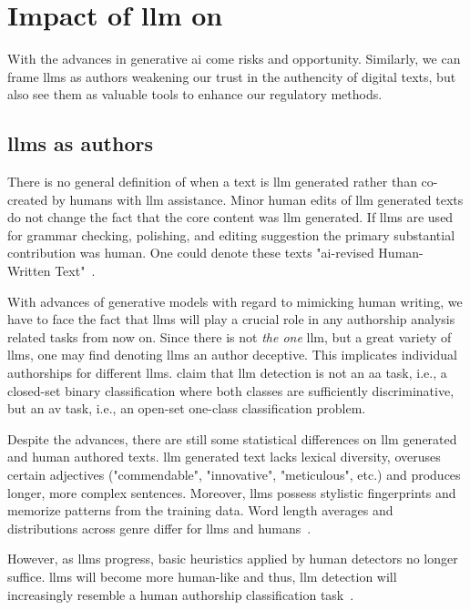 \section{Impact of \acs{llm} on \ai{}}

With the advances in generative \ac{ai} come risks and opportunity.
Similarly, we can frame \acp{llm} as authors weakening our trust in the authencity of digital texts, but also see them as valuable tools to enhance our regulatory methods.

\subsection{\acp{llm} as authors}
There is no general definition of when a text is \ac{llm} generated rather than co-created by humans with \ac{llm} assistance.
Minor human edits of \ac{llm} generated texts do not change the fact that the core content was \ac{llm} generated.
If \acp{llm} are used for grammar checking, polishing, and editing suggestion the primary substantial contribution was human.
One could denote these texts "\ac{ai}-revised Human-Written Text"~\citep{wang_stumbling_2024}.

With advances of generative models with regard to mimicking human writing, we have to face the fact that \acp{llm} will play a crucial role in any authorship analysis related tasks from now on.
Since there is not \textit{the one} \ac{llm}, but a great variety of \acp{llm}, one may find denoting \acp{llm} an author deceptive.
This implicates individual authorships for different \acp{llm}.
\citet{llm_detection_av_2025} claim that \ac{llm} detection is not an \ac{aa} task, i.e., a closed-set binary classification where both classes are sufficiently discriminative, but an \ac{av} task, i.e., an open-set one-class classification problem. 

Despite the advances, there are still some statistical differences on \ac{llm} generated and human authored texts.
\ac{llm} generated text lacks lexical diversity, overuses certain adjectives ("commendable", "innovative", "meticulous", etc.) and produces longer, more complex sentences.
Moreover, \acp{llm} possess stylistic fingerprints and memorize patterns from the training data.
Word length averages and distributions across genre differ for \acp{llm} and humans~\citep{llm_detection_av_2025}.

However, as \acp{llm} progress, basic heuristics applied by human detectors no longer suffice.
\acp{llm} will become more human-like and thus, \ac{llm} detection will increasingly resemble a human authorship classification task~\citep{llm_detection_av_2025}.


